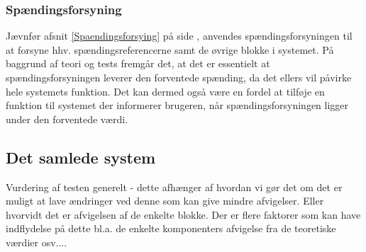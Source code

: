 \subsubsection{Spændingsforsyning}
Jævnfør afsnit \ref{Spaendingsforsying} på side \pageref{Spaendingsforsying}, anvendes spændingsforsyningen til at forsyne hhv. spændingsreferencerne samt de øvrige blokke i systemet. På baggrund af teori og tests fremgår det, at det er essentielt at spændingsforsyningen leverer den forventede spænding, da det ellers vil påvirke hele systemets funktion. Det kan dermed også være en fordel at tilføje en funktion til systemet der informerer brugeren, når spændingsforsyningen ligger under den forventede værdi. 

 
\subsection{Det samlede system}
Vurdering af testen generelt - dette afhænger af hvordan vi gør det om det er muligt at lave ændringer ved denne som kan give mindre afvigelser. Eller hvorvidt det er afvigelsen af de enkelte blokke. Der er flere faktorer som kan have indflydelse på dette bl.a. de enkelte komponenters afvigelse fra de teoretiske værdier osv....
\clearpage
